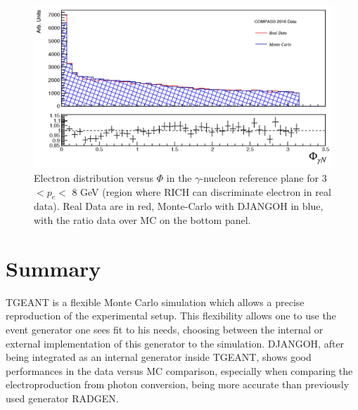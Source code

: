 \begin{figure}[!h]
  \centering
	\includegraphics[scale=0.6]{./gfx/Eprod2016.png}
	\caption{Electron distribution versus $\Phi$ in the $\gamma$-nucleon reference plane for 3 $< p_e <$ 8 GeV (region where RICH can discriminate electron in real data). Real Data are in red, Monte-Carlo with DJANGOH in blue, with the ratio data over MC on the bottom panel.}
	\label{pic:Eprod2016}
\end{figure}


\section{Summary}

TGEANT is a flexible Monte Carlo simulation which allows a precise reproduction of the experimental setup. This flexibility allows one to use the event generator one sees fit to his needs, choosing between the internal or external implementation of this generator to the simulation. DJANGOH, after being integrated as an internal generator inside TGEANT, shows good performances in the data versus MC comparison, especially when comparing the electroproduction from photon conversion, being more accurate than previously used generator RADGEN.

